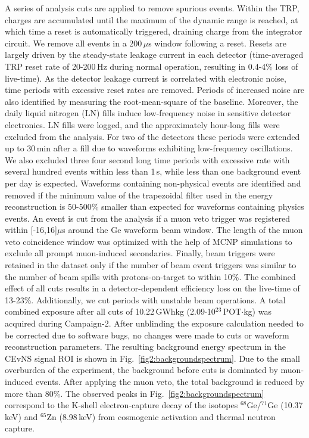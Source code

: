 \documentclass[aps,prltightenlines,superscriptaddress,nofootinbib,amsmath,amssymb,reprint]{revtex4-2}
\begin{document}
A series of analysis cuts are applied to remove spurious events. Within the TRP, charges are accumulated until the maximum of the dynamic range is reached, at which time a reset is automatically triggered, draining charge from the integrator circuit. 
We remove all events in a 200\,$\mu$s window following a reset.
Resets are largely driven by the steady-state leakage current in each detector (time-averaged TRP reset rate of 20-200\,Hz during normal operation, resulting in 0.4-4\% loss of live-time). As the detector leakage current is correlated with electronic noise, time periods with excessive reset rates are removed. Periods of increased noise are also identified by measuring the root-mean-square of the baseline. 
Moreover, the daily liquid nitrogen (LN) fills induce low-frequency noise in sensitive detector electronics. 
LN fills were logged, and the approximately hour-long fills were excluded from the analysis. For two of the detectors these periods were extended up to 30\,min after a fill due to waveforms exhibiting low-frequency oscillations. We also excluded three four second long time periods with excessive rate with several hundred events within less than 1\,s, while less than one background event per day is expected.
Waveforms containing non-physical events are identified and removed if the minimum value of the trapezoidal filter used in the energy reconstruction is 50-500\% smaller than expected for waveforms containing physics events.
An event is cut from the analysis if a muon veto trigger was registered within [-16,16]$\mu$s around the Ge waveform beam window. 
The length of the muon veto coincidence window was optimized with the help of MCNP simulations \cite{TechReport_2023_LANL_MNCP} to exclude all prompt muon-induced secondaries.
Finally, beam triggers were retained in the dataset only if the number of beam event triggers was similar to the number of beam spills with protons-on-target to within 10\%.
The combined effect of all cuts results in a detector-dependent efficiency loss on the live-time of 13-23\%.
Additionally, we cut periods with unstable beam operations.
A total combined exposure after all cuts of 10.22\,GWhkg (2.09$\cdot$10$^{23}$\,POT$\cdot$kg) was acquired during Campaign-2. After unblinding the exposure calculation needed to be corrected due to software bugs, no changes were made to cuts or waveform reconstruction parameters. The resulting background energy spectrum in the CEvNS signal ROI is shown in Fig.~\ref{fig2:backgroundspectrum}.
Due to the small overburden of the experiment, the background before cuts is dominated by muon-induced events. After applying the muon veto, the total background is reduced by more than 80\%.
The observed peaks in Fig.~\ref{fig2:backgroundspectrum} correspond to the K-shell electron-capture decay of the isotopes $^{68}$Ge/$^{71}$Ge (10.37\,keV) and $^{65}$Zn (8.98\,keV) from cosmogenic activation and thermal neutron capture. 
\end{document}
